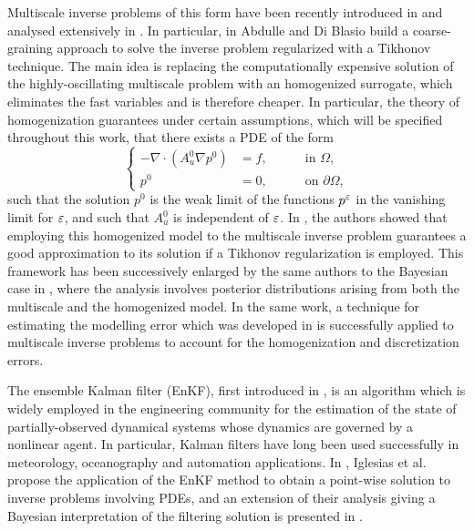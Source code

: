 \documentclass[10pt]{article}
\begin{document}
Multiscale inverse problems of this form have been recently introduced in \cite{NPS12} and analysed extensively in \cite{AbD17, AbD18}. In particular, in \cite{AbD17} Abdulle and Di Blasio build a coarse-graining approach to solve the inverse problem regularized with a Tikhonov technique. The main idea is replacing the computationally expensive solution of the highly-oscillating multiscale problem with an homogenized surrogate, which eliminates the fast variables and is therefore cheaper. In particular, the theory of homogenization guarantees under certain assumptions, which will be specified throughout this work, that there exists a PDE of the form
\begin{equation}
\left\{
\begin{alignedat}{2}
- \nabla \cdot ( A^0_u \nabla p^0 ) &= f, \quad && \text{ in } \Omega, \\
p^0 &= 0, \quad && \text{ on } \partial \Omega,
\end{alignedat}
\right.
\end{equation}
such that the solution $p^0$ is the weak limit of the functions $p^\varepsilon$ in the vanishing limit for $\varepsilon$, and such that $A_u^0$ is independent of $\varepsilon$. In \cite{AbD17}, the authors showed that employing this homogenized model to the multiscale inverse problem guarantees a good approximation to its solution if a Tikhonov regularization is employed. This framework has been successively enlarged by the same authors to the Bayesian case in \cite{AbD17}, where the analysis involves posterior distributions arising from both the multiscale and the homogenized model. In the same work, a technique for estimating the modelling error which was developed in \cite{CES14, CDS18} is successfully applied to multiscale inverse problems to account for the homogenization and discretization errors.

The ensemble Kalman filter (EnKF), first introduced in \cite{Eve94}, is an algorithm which is widely employed in the engineering community for the estimation of the state of partially-observed dynamical systems whose dynamics are governed by a nonlinear agent. In particular, Kalman filters have long been used successfully in meteorology, oceanography and automation applications. In \cite{ILS13}, Iglesias et al. propose the application of the EnKF method to obtain a point-wise solution to inverse problems involving PDEs, and an extension of their analysis giving a Bayesian interpretation of the filtering solution is presented in \cite{ScS17}.
\end{document}
